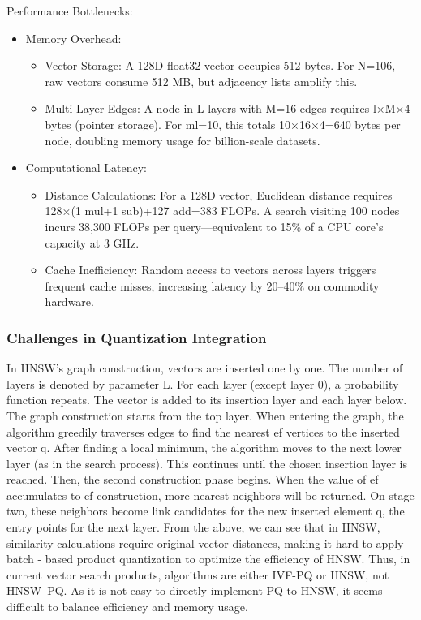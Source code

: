 \documentclass[sigconf, nonacm]{acmart}
\begin{document}
Performance Bottlenecks:
\begin{itemize}
    \item Memory Overhead:
    \begin{itemize}
        \item Vector Storage: A 128D float32 vector occupies 512 bytes. For N=106, raw vectors consume 512 MB, but adjacency lists amplify this.
        \item Multi-Layer Edges: A node in L layers with M=16 edges requires  l×M×4 bytes (pointer storage). For ml=10, this totals 10×16×4=640 bytes per node, doubling memory usage for billion-scale datasets.
    \end{itemize}
    \item Computational Latency:
    \begin{itemize}
        \item Distance Calculations: For a 128D vector, Euclidean distance requires 128×(1 mul+1 sub)+127 add=383 FLOPs. A search visiting 100 nodes incurs 38,300 FLOPs per query—equivalent to 15\% of a CPU core’s capacity at 3 GHz.
        \item	Cache Inefficiency: Random access to vectors across layers triggers frequent cache misses, increasing latency by 20–40\% on commodity hardware.
    \end{itemize}

\end{itemize}

\subsubsection{Challenges in Quantization Integration}
In HNSW's graph construction, vectors are inserted one by one. The number of layers is denoted by parameter L. For each layer (except layer 0), a probability function repeats. The vector is added to its insertion layer and each layer below. The graph construction starts from the top layer. When entering the graph, the algorithm greedily traverses edges to find the nearest ef vertices to the inserted vector q. 
After finding a local minimum, the algorithm moves to the next lower layer (as in the search process). This continues until the chosen insertion layer is reached. Then, the second construction phase begins.  When the value of ef accumulates to ef-construction, more nearest neighbors will be returned. On stage two, these neighbors become link candidates for the new inserted element q, the entry points for the next layer. 
From the above, we can see that in HNSW, similarity calculations require original vector distances, making it hard to apply batch - based product quantization to optimize the efficiency of HNSW. Thus, in current vector search products, algorithms are either IVF-PQ or HNSW, not HNSW–PQ. As it is not easy to directly implement PQ to HNSW, it seems difficult to balance efficiency and memory usage.
\end{document}
